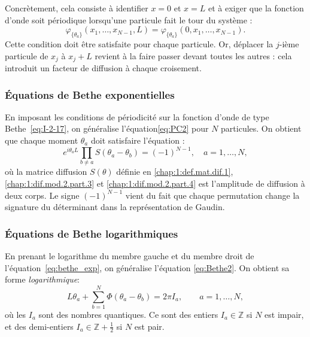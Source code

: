 Concrètement, cela consiste à identifier $x = 0$ et $x = L$ et à exiger que la fonction d’onde soit périodique lorsqu’une particule fait le tour du système :
\begin{equation}\label{eq:periodic}
\varphi_{\{\theta_a\}}(x_1, \dots, x_{N-1}, L) = \varphi_{\{\theta_a\}}(0, x_1, \dots, x_{N-1}).
\end{equation}
Cette condition doit être satisfaite pour chaque particule. Or, déplacer la $j$-ième particule de $x_j$ à $x_j + L$ revient à la faire passer devant toutes les autres : cela introduit un facteur de diffusion à chaque croisement.


\subsubsection{Équations de Bethe exponentielles}

En imposant les conditions de périodicité sur la fonction d’onde de type Bethe~\eqref{eq:I-2-17}, on généralise l'équation\eqref{eq:PC2} pour $N$ particules. On obtient que chaque moment $\theta_a$ doit satisfaire l’équation :
\begin{equation}
	e^{i \theta_a L} \prod_{b \ne a} S(\theta_a - \theta_b) = (-1)^{N-1}, \quad a = 1, \dots, N,
	\label{eq:bethe_exp}
\end{equation}
où la matrice diffusion $S(\theta)$ définie en \eqref{chap:1:def.mat.dif.1}, \eqref{chap:1:dif.mod.2.part.3} et \eqref{chap:1:dif.mod.2.part.4} est l’amplitude de diffusion à deux corps. Le signe $(-1)^{N-1}$ vient du fait que chaque permutation change la signature du déterminant dans la représentation de Gaudin.

\subsubsection{Équations de Bethe logarithmiques}

En prenant le logarithme du membre gauche et du membre droit de l’équation~\eqref{eq:bethe_exp}, on généralise l'équation \eqref{eq:Bethe2}. On obtient sa forme {\em logarithmique}:
\begin{equation}\label{chap:1:eq:EBA}
	L \theta_a + \sum_{b=1}^N \Phi(\theta_a - \theta_b) = 2\pi I_a, \qquad a = 1, \dots, N,
\end{equation}
où les $I_a$ sont des nombres quantiques. Ce sont des entiers $I_a \in \mathbb{Z}$ si $N$ est impair, et des demi-entiers $I_a \in \mathbb{Z} + \tfrac{1}{2}$ si $N$ est pair.

